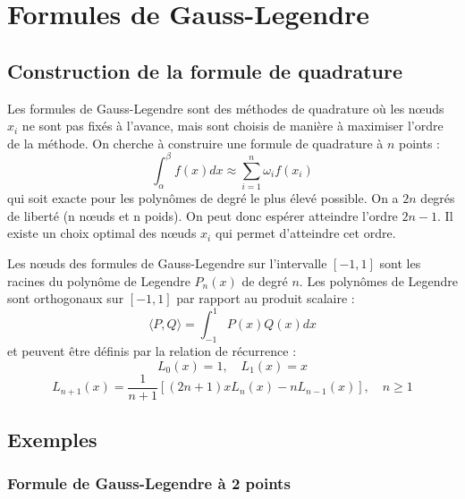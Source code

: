 \documentclass{article}
\begin{document}
\section{Formules de Gauss-Legendre}

\subsection{Construction de la formule de quadrature}

Les formules de Gauss-Legendre sont des méthodes de quadrature où les nœuds $x_i$ ne sont pas fixés à l'avance, mais sont choisis de manière à maximiser l'ordre de la méthode.  On cherche à construire une formule de quadrature à $n$ points :
\[
\int_{\alpha}^{\beta} f(x) dx \approx \sum_{i=1}^{n} \omega_i f(x_i)
\]
qui soit exacte pour les polynômes de degré le plus élevé possible. On a $2n$ degrés de liberté (n nœuds et n poids). On peut donc espérer atteindre l'ordre $2n-1$.  Il existe un choix optimal des nœuds $x_i$ qui permet d'atteindre cet ordre.

Les nœuds des formules de Gauss-Legendre sur l'intervalle $[-1, 1]$ sont les racines du polynôme de Legendre $P_n(x)$ de degré $n$. Les polynômes de Legendre sont orthogonaux sur $[-1, 1]$ par rapport au produit scalaire :
\[
\langle P, Q \rangle = \int_{-1}^{1} P(x) Q(x) dx
\]
et peuvent être définis par la relation de récurrence :
\[
L_0(x) = 1, \quad L_1(x) = x
\]
\[
L_{n+1}(x) = \frac{1}{n+1} \left[ (2n+1) x L_n(x) - n L_{n-1}(x) \right], \quad n \geq 1
\]

\subsection{Exemples}

\subsubsection{Formule de Gauss-Legendre à 2 points}
\end{document}
